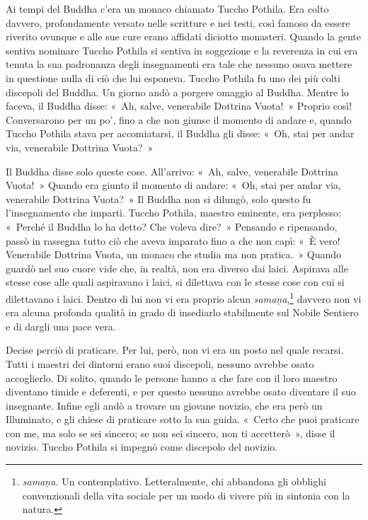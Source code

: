Ai tempi del Buddha c'era un monaco chiamato Tuccho Pothila. Era colto
davvero, profondamente versato nelle scritture e nei testi, così famoso
da essere riverito ovunque e alle sue cure erano affidati diciotto
monasteri. Quando la gente sentiva nominare Tuccho Pothila si sentiva in
soggezione e la reverenza in cui era tenuta la sua padronanza degli
insegnamenti era tale che nessuno osava mettere in questione nulla di
ciò che lui esponeva. Tuccho Pothila fu uno dei più colti discepoli del
Buddha. Un giorno andò a porgere omaggio al Buddha. Mentre lo faceva, il
Buddha disse: «~Ah, salve, venerabile Dottrina Vuota!~» Proprio così!
Conversarono per un po', fino a che non giunse il momento di andare e,
quando Tuccho Pothila stava per accomiatarsi, il Buddha gli disse: «~Oh,
stai per andar via, venerabile Dottrina Vuota?~»

Il Buddha disse solo queste cose. All'arrivo: «~Ah, salve, venerabile
Dottrina Vuota!~» Quando era giunto il momento di andare: «~Oh, stai per
andar via, venerabile Dottrina Vuota?~» Il Buddha non si dilungò, solo
questo fu l'insegnamento che impartì. Tuccho Pothila, maestro eminente,
era perplesso: «~Perché il Buddha lo ha detto? Che voleva dire?~»
Pensando e ripensando, passò in rassegna tutto ciò che aveva imparato
fino a che non capì: «~È vero! Venerabile Dottrina Vuota, un monaco che
studia ma non pratica.~» Quando guardò nel suo cuore vide che, in
realtà, non era diverso dai laici. Aspirava alle stesse cose alle quali
aspiravano i laici, si dilettava con le stesse cose con cui si
dilettavano i laici. Dentro di lui non vi era proprio alcun
\emph{samaṇa},\footnote{\emph{samaṇa.} Un contemplativo. Letteralmente,
  chi abbandona gli obblighi convenzionali della vita sociale per un
  modo di vivere più in sintonia con la natura.} davvero non vi era
alcuna profonda qualità in grado di insediarlo stabilmente sul Nobile
Sentiero e di dargli una pace vera.

Decise perciò di praticare. Per lui, però, non vi era un posto nel quale
recarsi. Tutti i maestri dei dintorni erano suoi discepoli, nessuno
avrebbe osato accoglierlo. Di solito, quando le persone hanno a che fare
con il loro maestro diventano timide e deferenti, e per questo nessuno
avrebbe osato diventare il suo insegnante. Infine egli andò a trovare un
giovane novizio, che era però un Illuminato, e gli chiese di praticare
sotto la sua guida. «~Certo che puoi praticare con me, ma solo se sei
sincero; se non sei sincero, non ti accetterò~», disse il novizio.
Tuccho Pothila si impegnò come discepolo del novizio.

